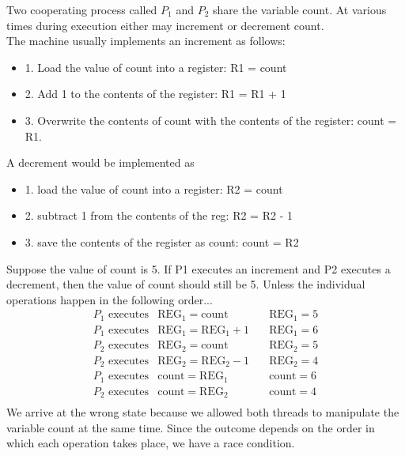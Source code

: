 \documentclass[a4paper, 10pt]{article}
\begin{document}
\begin{examplebox}{}{}
    Two cooperating process called $P_1$ and $P_2$ share the variable count. At various times during execution either may increment or decrement count. \\[2ex]

    The machine usually implements an increment as follows:
    \begin{itemize}
        \item 1. Load the value of count into a register: R1 = count
        \item 2. Add 1 to the contents of the register: R1 = R1 + 1
        \item 3. Overwrite the contents of count with the contents of the register: count = R1.
    \end{itemize}
    A decrement would be implemented as
    \begin{itemize}
        \item  1. load the value of count into a register: R2 = count
        \item  2. subtract 1 from the contents of the reg: R2 = R2 - 1
        \item 3. save the contents of the register as count: count = R2
    \end{itemize}
    Suppose the value of count is 5. If P1 executes an increment and P2 executes a decrement, then the value of count should still be 5. Unless the individual operations happen in the following order...
    $$
        \begin{array}{rlrl}
            P_1 \text{ executes} & \text{REG}_1 = \text{count}     & \quad \text{REG}_1 = 5 \\
            P_1 \text{ executes} & \text{REG}_1 = \text{REG}_1 + 1 & \quad \text{REG}_1 = 6 \\
            P_2 \text{ executes} & \text{REG}_2 = \text{count}     & \quad \text{REG}_2 = 5 \\
            P_2 \text{ executes} & \text{REG}_2 = \text{REG}_2 - 1 & \quad \text{REG}_2 = 4 \\
            P_1 \text{ executes} & \text{count} = \text{REG}_1     & \quad \text{count} = 6 \\
            P_2 \text{ executes} & \text{count} = \text{REG}_2     & \quad \text{count} = 4 \\
        \end{array}
    $$
    We arrive at the wrong state because we allowed both threads to manipulate the variable count at the same time. Since the outcome depends on the order in which each operation takes place, we have a race condition.
\end{examplebox}
\end{document}
